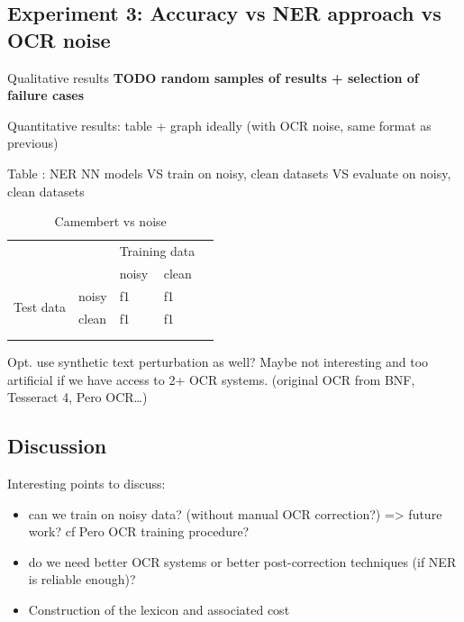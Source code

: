 \subsection{Experiment 3: Accuracy vs NER approach vs OCR noise}

Qualitative results
\textbf{TODO random samples of results + selection of failure cases}

Quantitative results: table + graph ideally (with OCR noise, same format as previous)

Table : NER NN models VS train on {noisy, clean} datasets VS evaluate on {noisy, clean} datasets


\begin{table}
\caption{Camembert vs noise}
\centering
\begin{tabular}{ll|ll|l}
                            &                      & \multicolumn{2}{l|}{Training data} &   \\
                            &                      & noisy & clean                      &   \\ 
\cline{1-4}
\multirow{2}{*}{Test data } & noisy                & f1    & f1                         &   \\
                            & clean                & f1    & f1                         &   \\ 
\cline{1-4}
                            & \multicolumn{1}{l}{} &       & \multicolumn{1}{l}{}       &   \\
                            & \multicolumn{1}{l}{} &       & \multicolumn{1}{l}{}       &  
\end{tabular}
\end{table}



Opt. use synthetic text perturbation as well? Maybe not interesting and too artificial if we have access to 2+ OCR systems.
(original OCR from BNF, Tesseract 4, Pero OCR…)


\subsection{Discussion}
Interesting points to discuss:
\begin{itemize}
    \item can we train on noisy data? (without manual OCR correction?) => future work? cf Pero OCR training procedure?
    \item do we need better OCR systems or better post-correction techniques (if NER is reliable enough)?
    \item Construction of the lexicon and associated cost
\end{itemize}
